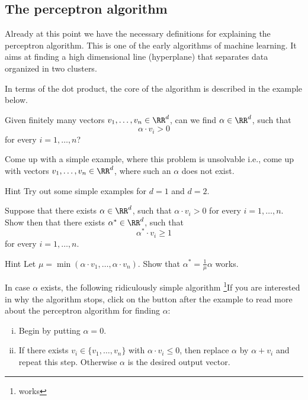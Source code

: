 \documentclass{article}
\begin{document}
\subsection{The perceptron algorithm}\label{sectperceptron}

Already at this point we have the necessary definitions for explaining the
perceptron algorithm. This is one of the early algorithms of machine learning.
It aims at finding a high dimensional line (hyperplane) that separates data
organized in two clusters.

In terms of the dot product, the core of the algorithm is described in
the example below.

\begin{example}\label{exampleperceptronsimple}




  Given finitely many vectors $v_1, \dots, v_n\in \RR^d$, can we find
  $\alpha\in \RR^d$, such that
  $$
  \alpha\cdot v_i > 0
  $$
  for every $i = 1, \dots, n$?


  
\beginshex
Come up with a simple example, where this problem is unsolvable i.e., come
up with vectors $v_1, \dots, v_n\in \RR^d$, where such an $\alpha$ does not
exist.

\begin{hideinbutton}{Hint}
  Try out some simple examples for $d=1$ and $d=2$.
\end{hideinbutton}  
\endshex

\beginshex
Suppose that there exists $\alpha\in \RR^d$, such that
$\alpha\cdot v_i > 0$ for every $i = 1, \dots, n$. Show then that
there exists $\alpha^*\in \RR^d$, such that
$$
\alpha^* \cdot v_i \geq 1
$$
for every $i = 1, \dots, n$.

\begin{hideinbutton}{Hint}
  Let $\mu = \min(\alpha\cdot v_1, \dots, \alpha\cdot v_n)$. Show that
  $\alpha^* = \frac{1}{\mu} \alpha$ works.
\end{hideinbutton}
\endshex

In case $\alpha$ exists, the following
ridiculously simple algorithm \footnote{works}{If you are interested in why the algorithm stops, click on the button after the example to read more about the perceptron algorithm} for finding $\alpha$:

  \begin{enumerate}[(i)]
  \item Begin by putting $\alpha = 0$.
  \item If there exists $v_i\in \{v_1, \dots, v_n\}$ with $\alpha\cdot v_i \leq 0$, then replace
    $\alpha$ by $\alpha + v_i$ and repeat this step. Otherwise $\alpha$ is the desired output vector.
  \end{enumerate}
    

\end{example}
\end{document}
